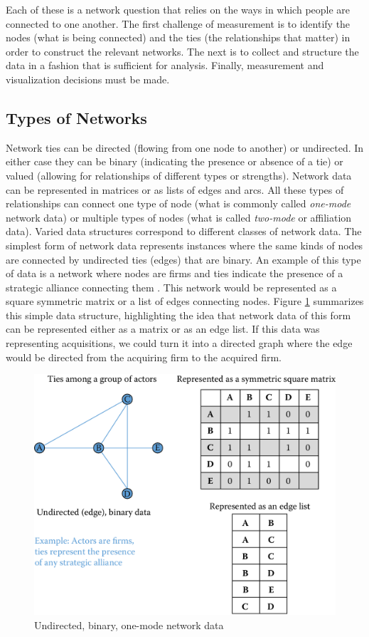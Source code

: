 \documentclass[]{krantz}
\begin{document}
Each of these is a network question that relies on the ways in which
people are connected to one another. The first challenge of measurement
is to identify the nodes (what is being connected) and the ties (the
relationships that matter) in order to construct the relevant networks.
The next is to collect and structure the data in a fashion that is
sufficient for analysis. Finally, measurement and visualization
decisions must be made.

\subsection{Types of Networks}\label{types-of-networks}

Network ties can be directed (flowing from one node to another) or
undirected. In either case they can be binary (indicating the presence
or absence of a tie) or valued (allowing for relationships of different
types or strengths). Network data can be represented in matrices or as
lists of edges and arcs. All these types of relationships can connect
one type of node (what is commonly called \emph{one-mode} network data)
or multiple types of nodes (what is called \emph{two-mode} or
affiliation data). Varied data structures correspond to different
classes of network data. The simplest form of network data represents
instances where the same kinds of nodes are connected by undirected ties
(edges) that are binary. An example of this type of data is a network
where nodes are firms and ties indicate the presence of a strategic
alliance connecting them \citep{powell2005network}. This network would
be represented as a square symmetric matrix or a list of edges
connecting nodes. Figure \ref{fig:fig8-1} summarizes this simple data
structure, highlighting the idea that network data of this form can be
represented either as a matrix or as an edge list. If this data was
representing acquisitions, we could turn it into a directed graph where
the edge would be directed from the acquiring firm to the acquired firm.

\begin{figure}

{\centering \includegraphics[width=0.7\linewidth]{ChapterNetworks/figures/fig8-1} 

}

\caption{Undirected, binary, one-mode network data}\label{fig:fig8-1}
\end{figure}
\end{document}

